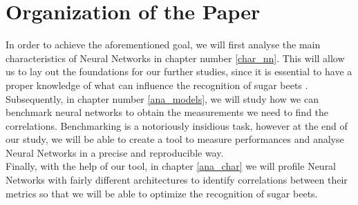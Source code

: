 \section{Organization of the Paper}
In order to achieve the aforementioned goal, we will first analyse the main characteristics of Neural Networks in chapter number \ref{char_nn}. This will allow us to lay out the foundations for our further studies, since it is essential to have a proper knowledge of what can influence the recognition of sugar beets .\\
Subsequently, in chapter number \ref{ana_models}, we will study how we can benchmark neural networks to obtain the measurements we need to find the correlations. Benchmarking is a notoriously insidious task, however at the end of our study, we will be able to create a tool to measure performances and analyse Neural Networks in a precise and reproducible way.\\
Finally, with the help of our tool, in chapter \ref{ana_char} we will profile Neural Networks with fairly different architectures to identify correlations between their metrics so that we will be able to optimize the recognition of sugar beets. 
